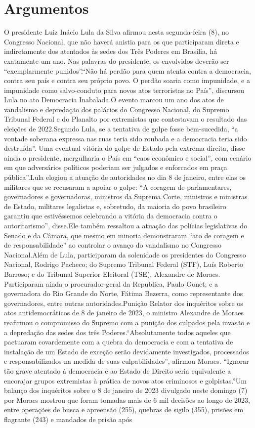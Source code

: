 \documentclass[
   article,       
   12pt,          
   oneside,       
   a4paper,       
   english,       
   brazil,        
   sumario=tradicional
   ]{abntex2}
\begin{document}
\section{Argumentos}
O presidente Luiz Inácio Lula da Silva afirmou nesta segunda-feira (8), no Congresso Nacional, que não haverá anistia para os que participaram direta e indiretamente dos atentados às sedes dos Três Poderes em Brasília, há exatamente um ano. Nas palavras do presidente, os envolvidos deverão ser “exemplarmente punidos”.“Não há perdão para quem atenta contra a democracia, contra seu país e contra seu próprio povo. O perdão soaria como impunidade, e a impunidade como salvo-conduto para novos atos terroristas no País”, discursou Lula no ato Democracia Inabalada.O evento marcou um ano dos atos de vandalismo e depredação dos palácios do Congresso Nacional, do Supremo Tribunal Federal e do Planalto por extremistas que contestavam o resultado das eleições de 2022.Segundo Lula, se a tentativa de golpe fosse bem-sucedida, “a vontade soberana expressa nas ruas teria sido roubada e a democracia teria sido destruída”. Uma eventual vitória do golpe de Estado pela extrema direita, disse ainda o presidente, mergulharia o País em “caos econômico e social”, com cenário em que \textquotedbl{}adversários políticos poderiam ser julgados e enforcados em praça pública”.Lula elogiou a atuação de autoridades no dia 8 de janeiro, entre elas os militares que se recusaram a apoiar o golpe: “A coragem de parlamentares, governadores e governadoras, ministros da Suprema Corte, ministros e ministras de Estado, militares legalistas e, sobretudo, da maioria do povo brasileiro garantiu que estivéssemos celebrando a vitória da democracia contra o autoritarismo”, disse.Ele também ressaltou a atuação das polícias legislativas do Senado e da Câmara, que mesmo em minoria demonstraram “ato de coragem e de responsabilidade” ao controlar o avanço do vandalismo no Congresso Nacional.Além de Lula, participaram da solenidade os presidentes do Congresso Nacional, Rodrigo Pacheco; do Supremo Tribunal Federal (STF), Luís Roberto Barroso; e do Tribunal Superior Eleitoral (TSE), Alexandre de Moraes. Participaram ainda o procurador-geral da Republica, Paulo Gonet; e a governadora do Rio Grande do Norte, Fátima Bezerra, como representante dos governadores, entre outras autoridades.Punição Relator dos inquéritos sobre os atos antidemocráticos de 8 de janeiro de 2023, o ministro Alexandre de Moraes reafirmou o compromisso do Supremo com a punição dos culpados pela invasão e a depredação das sedes dos três Poderes.“Absolutamente todos aqueles que pactuaram covardemente com a quebra da democracia e com a tentativa de instalação de um Estado de exceção serão devidamente investigados, processados e responsabilizados na medida de suas culpabilidades”, afirmou Moraes. “Ignorar tão grave atentado à democracia e ao Estado de Direito seria equivalente a encorajar grupos extremistas à prática de novos atos criminosos e golpistas.”Um balanço dos inquéritos sobre o 8 de janeiro de 2023 divulgado neste domingo (7) por Moraes mostrou que foram tomadas mais de 6 mil decisões ao longo de 2023, entre operações de busca e apreensão (255), quebras de sigilo (355), prisões em flagrante (243) e mandados de prisão após 
\end{document}
